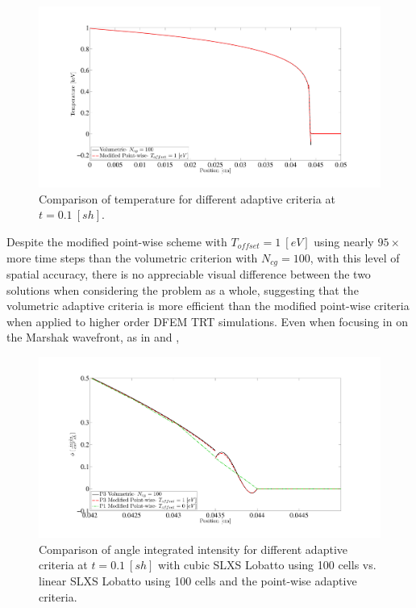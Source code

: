 \begin{figure}[!htp]
\centering
\includegraphics[width=16cm,trim=2in  0.4in 0.5in 0.75in,clip=true]{chapter6_grey_radtran/Dissertation_Data/100C_Physical_Marshak_Wave_Temperature_Adaptive_Comparison_Final_1eV.pdf}
\caption{Comparison of temperature for different adaptive criteria at $t=0.1~[sh]$.}
\label{fig:time_difference_temperature}
\end{figure}
%
%
%
Despite the modified point-wise scheme with $T_{offset}=1~[eV]$ using nearly $95\times$ more time steps than the volumetric criterion with $N_{cg}=100$, with this level of spatial accuracy, there is no appreciable visual difference between the two solutions when considering the problem as a whole, suggesting that the volumetric adaptive criteria is more efficient than the modified point-wise criteria when applied to higher order DFEM TRT simulations.
Even when focusing in on the Marshak wavefront, as in  and , 
%
%
%
\begin{figure}[!htp]
\centering
\includegraphics[width=16cm,trim=2in  0.4in 0.5in 0.75in,clip=true]{chapter6_grey_radtran/Dissertation_Data/P3_P1_100C_vs_Physical_Marshak_Wave_Radiation_Comparison_Final_Zoom.pdf}
\caption{Comparison of angle integrated intensity for different adaptive criteria at $t=0.1~[sh]$ with cubic SLXS Lobatto using 100 cells vs. linear SLXS Lobatto using 100 cells and the point-wise adaptive criteria.}
\label{fig:time_difference_radiation_zoom}
\end{figure}

